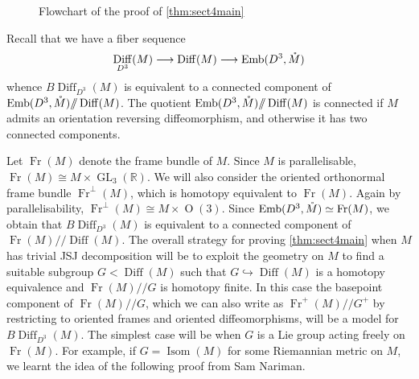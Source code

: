 \documentclass{amsart}
\theoremstyle{plain}
\theoremstyle{definition}
\DeclareMathOperator\Diff{Diff}
\DeclareMathOperator\Isom{Isom}
\DeclareMathOperator\emb{Emb}
\DeclareMathOperator\Or{O}
\DeclareMathOperator\GL{GL}
\DeclareMathOperator\Fr{Fr}
\newcommand{\interior}[1]{\smash{\mathring{#1}}}
\newcommand{\hq}{/\!\!/} %
\newcommand{\BDiff}{B\!\Diff}
\newcommand{\bbR}{\mathbb{R}}
\begin{document}
\begin{figure}
{
}%
    \caption{Flowchart of the proof of \cref{thm:sect4main}}
    \label{fig:flowchartirreducible}
\end{figure}

Recall that we have a fiber sequence 
\begin{equation*}
    \Diff_{D^3}(M)\longrightarrow \Diff(M)\longrightarrow \emb(D^3,\interior{M})
\end{equation*}
whence $\BDiff_{D^3}(M)$ is equivalent to a connected component of $\emb(D^3,\interior{M})\hq \Diff(M)$.
The quotient $\emb(D^3,\interior{M})\hq \Diff(M)$ is connected if $M$ admits an orientation reversing diffeomorphism, and otherwise it has two connected components.

Let $\Fr(M)$ denote the frame bundle of $M$. 
Since $M$ is parallelisable, $\Fr(M)\cong M\times\GL_3(\bbR)$. 
We will also consider the oriented orthonormal frame bundle $\Fr^\perp(M)$, which is homotopy equivalent to $\Fr(M)$.  
Again by parallelisability, $\Fr^\perp(M)\cong M\times \Or(3)$. 
Since $\emb(D^3,\interior{M})\simeq \Fr(M)$, we obtain
that $\BDiff_{D^3}(M)$ is equivalent to a connected component of $\Fr(M) \hq \Diff(M)$.
The overall strategy for proving \cref{thm:sect4main} when $M$ has trivial JSJ decomposition will be to exploit the geometry on $M$ to find a suitable subgroup $G< \Diff(M)$ such that $G\hookrightarrow \Diff(M)$ is a homotopy equivalence and $\Fr(M)\hq G$ is homotopy finite.
In this case the basepoint component of $\Fr(M) \hq G$, which we can also write as $\Fr^+(M)\hq G^+$ by restricting to oriented frames and oriented diffeomorphisms, 
will be a model for $\BDiff_{D^3}(M)$. 
The simplest case will be when $G$ is a Lie group acting freely on $\Fr(M)$. For example, if $G=\Isom(M)$ for some Riemannian metric on $M$, we learnt the idea of the following proof from Sam Nariman.
\end{document}
